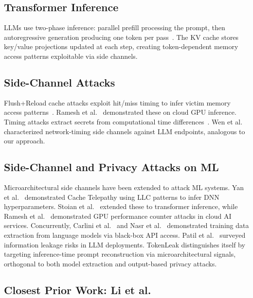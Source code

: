 \documentclass[journal,10pt,twocolumn]{IEEEtran}
\begin{document}
\subsection{Transformer Inference}

LLMs use two-phase inference: parallel prefill processing the prompt, then
autoregressive generation producing one token per pass~\cite{vaswani2017attention,brown2020language}.
The KV cache stores key/value projections updated at each step, creating token-dependent
memory access patterns exploitable via side channels.

\subsection{Side-Channel Attacks}

Flush+Reload cache attacks exploit hit/miss timing to infer victim memory access
patterns~\cite{yarom2014flush}. Ramesh et al.~\cite{ramesh2024profiling} demonstrated these
on cloud GPU inference. Timing attacks extract secrets from computational time differences~\cite{kocher1996timing}.
Wen et al.~\cite{wen2024side} characterized network-timing side channels against LLM endpoints,
analogous to our approach.

\subsection{Side-Channel and Privacy Attacks on ML}

Microarchitectural side channels have been extended to attack ML systems.
Yan et al.~\cite{yan2020cache} demonstrated Cache Telepathy using LLC
patterns to infer DNN hyperparameters. Stoian et al.~\cite{stoian2024cachegrind}
extended these to transformer inference, while Ramesh et al.~\cite{ramesh2024profiling}
demonstrated GPU performance counter attacks in cloud AI services.
Concurrently, Carlini et al.~\cite{carlini2021extracting} and Nasr et
al.~\cite{nasr2023scalable} demonstrated training data extraction from
language models via black-box API access. Patil et al.~\cite{patil2024review}
surveyed information leakage risks in LLM deployments. TokenLeak distinguishes
itself by targeting inference-time prompt reconstruction via microarchitectural
signals, orthogonal to both model extraction and output-based privacy attacks.


\subsection{Closest Prior Work: Li et al.~\cite{li2024prompt}}
\end{document}
